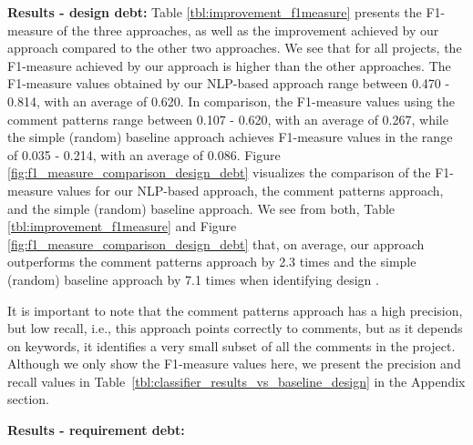 \vspace{1mm}

\noindent \textbf{Results - design debt:} Table \ref{tbl:improvement_f1measure} presents the F1-measure of the three approaches, as well as the improvement achieved by our approach compared to the other two approaches. We see that for all projects, the F1-measure achieved by our approach is higher than the other approaches. The F1-measure values obtained by our NLP-based approach range between 0.470 - 0.814, with an average of 0.620. In comparison, the F1-measure values using the comment patterns range between 0.107 - 0.620, with an average of 0.267, while the simple (random) baseline approach achieves F1-measure values in the range of 0.035 - 0.214, with an average of 0.086. Figure \ref{fig:f1_measure_comparison_design_debt} visualizes the comparison of the F1-measure values for our NLP-based approach, the comment patterns approach, and the simple (random) baseline approach. We see from both, Table \ref{tbl:improvement_f1measure} and Figure \ref{fig:f1_measure_comparison_design_debt} that, on average, our approach outperforms the comment patterns approach by 2.3 times and the simple (random) baseline approach by 7.1 times when identifying design \SATD.

It is important to note that the comment patterns approach has a high precision, but low recall, i.e., this approach points correctly to \SATD comments, but as it depends on keywords, it identifies a very small subset of all the \SATD comments in the project. Although we only show the F1-measure values here, we present the precision and recall values in Table~\ref{tbl:classifier_results_vs_baseline_design} in the Appendix section.  

\noindent \textbf{Results - requirement debt:}  
 
